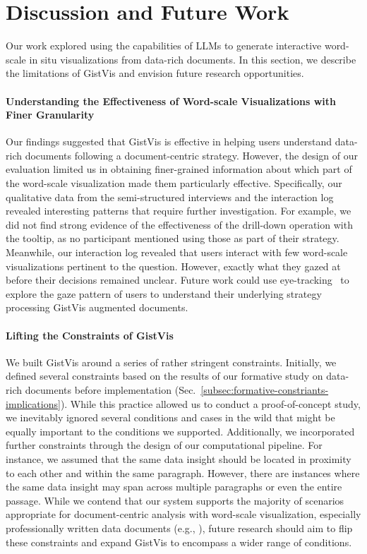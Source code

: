 \section{Discussion and Future Work}
Our work explored using the capabilities of LLMs to generate interactive word-scale in situ visualizations from data-rich documents. In this section, we describe the limitations of GistVis and envision future research opportunities.


\paragraph{Understanding the Effectiveness of Word-scale Visualizations with Finer Granularity}
Our findings suggested that GistVis is effective in helping users understand data-rich documents following a document-centric strategy. However, the design of our evaluation limited us in obtaining finer-grained information about which part of the word-scale visualization made them particularly effective. Specifically, our qualitative data from the semi-structured interviews and the interaction log revealed interesting patterns that require further investigation. For example, we did not find strong evidence of the effectiveness of the drill-down operation with the tooltip, as no participant mentioned using those as part of their strategy. Meanwhile, our interaction log revealed that users interact with few word-scale visualizations pertinent to the question. However, exactly what they gazed at before their decisions remained unclear. Future work could use eye-tracking~\cite{huth2024eye} to explore the gaze pattern of users to understand their underlying strategy processing GistVis augmented documents.


\paragraph{Lifting the Constraints of GistVis}
We built GistVis around a series of rather stringent constraints. Initially, we defined several constraints based on the results of our formative study on data-rich documents before implementation (Sec.~\ref{subsec:formative-constriants-implications}). While this practice allowed us to conduct a proof-of-concept study, we inevitably ignored several conditions and cases in the wild that might be equally important to the conditions we supported. Additionally, we incorporated further constraints through the design of our computational pipeline. For instance, we assumed that the same data insight should be located in proximity to each other and within the same paragraph. However, there are instances where the same data insight may span across multiple paragraphs or even the entire passage. While we contend that our system supports the majority of scenarios appropriate for document-centric analysis with word-scale visualization, especially professionally written data documents (e.g., \cite{us-k12-education}), future research should aim to flip these constraints and expand GistVis to encompass a wider range of conditions.

